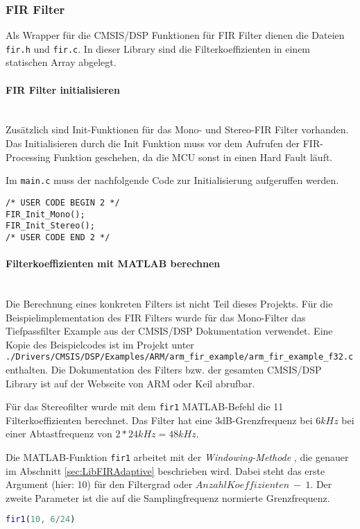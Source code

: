 \subsubsection{FIR Filter}
\label{sec:LibFIRFilter}

Als Wrapper für die CMSIS/DSP Funktionen für FIR Filter dienen die Dateien \texttt{fir.h} und \texttt{fir.c}. In dieser Library sind die Filterkoeffizienten in einem statischen Array abgelegt.
\\
\paragraph{FIR Filter initialisieren}\vspace{-0.3cm}\\
Zusätzlich sind Init-Funktionen für das Mono- und Stereo-FIR Filter vorhanden. 
Das Initialisieren durch die Init Funktion muss vor dem Aufrufen der FIR-Processing Funktion geschehen, da die MCU sonst in einen Hard Fault läuft.

Im \texttt{main.c} muss der nachfolgende Code zur Initialisierung aufgeruffen werden.

\begin{lstlisting}[style=Cuvision, caption={Init Funktion der FIR Filter}]
/* USER CODE BEGIN 2 */
FIR_Init_Mono();
FIR_Init_Stereo();
/* USER CODE END 2 */
\end{lstlisting}

\paragraph{Filterkoeffizienten mit MATLAB berechnen}\vspace{-0.3cm}\\
Die Berechnung eines konkreten Filters ist nicht Teil dieses Projekts.
Für die Beispielimplementation des FIR Filters wurde für das Mono-Filter das Tiefpassfilter Example aus der CMSIS/DSP Dokumentation verwendet. 
Eine Kopie des Beispielcodes ist im Projekt unter \\
\texttt{./Drivers/CMSIS/DSP/Examples/ARM/arm\_fir\_example/arm\_fir\_example\_f32.c} enthalten.
Die Dokumentation des Filters bzw. der gesamten CMSIS/DSP Library ist auf der Webseite von ARM \cite{cmsis-doc-arm} oder Keil \cite{cmsis-doc-keil} abrufbar.

Für das Stereofilter wurde mit dem \texttt{fir1} MATLAB-Befehl die 11 Filterkoeffizienten berechnet. Das Filter hat eine 3dB-Grenzfrequenz bei $6\si{kHz}$ bei einer Abtastfrequenz von $2*24\si{kHz}=48\si{kHz}$.

Die MATLAB-Funktion \texttt{fir1} arbeitet mit der \textit{Windowing-Methode} \cite{FIR-Windowing}, die genauer im Abschnitt \ref{sec:LibFIRAdaptive} beschrieben wird.
Dabei steht das erste Argument (hier: 10) für den Filtergrad oder $Anzahl Koeffizienten\ -\ 1$. Der zweite Parameter ist die auf die Samplingfrequenz normierte Grenzfrequenz.\\

\begin{lstlisting}[language=matlab]
fir1(10, 6/24)
\end{lstlisting}
